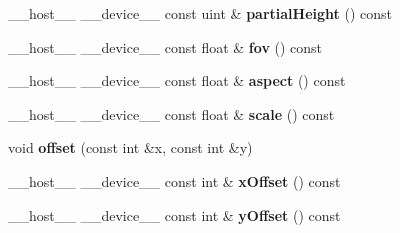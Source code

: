 \begin{DoxyCompactItemize}
\item 
\+\_\+\+\_\+host\+\_\+\+\_\+ \+\_\+\+\_\+device\+\_\+\+\_\+ const uint \& {\bfseries partial\+Height} () const\hypertarget{struct_camera_ab2c6118ca30fc99ec534d191c074279c}{}\label{struct_camera_ab2c6118ca30fc99ec534d191c074279c}

\item 
\+\_\+\+\_\+host\+\_\+\+\_\+ \+\_\+\+\_\+device\+\_\+\+\_\+ const float \& {\bfseries fov} () const\hypertarget{struct_camera_a3b18014eda80437e57d5293a846bca40}{}\label{struct_camera_a3b18014eda80437e57d5293a846bca40}

\item 
\+\_\+\+\_\+host\+\_\+\+\_\+ \+\_\+\+\_\+device\+\_\+\+\_\+ const float \& {\bfseries aspect} () const\hypertarget{struct_camera_ab6076c70d19aa5839112a033511e2640}{}\label{struct_camera_ab6076c70d19aa5839112a033511e2640}

\item 
\+\_\+\+\_\+host\+\_\+\+\_\+ \+\_\+\+\_\+device\+\_\+\+\_\+ const float \& {\bfseries scale} () const\hypertarget{struct_camera_a73cfa71841467a185998ea264839b111}{}\label{struct_camera_a73cfa71841467a185998ea264839b111}

\item 
void {\bfseries offset} (const int \&x, const int \&y)\hypertarget{struct_camera_ac0bcd3aa77ece7888c5bc1c894ae062a}{}\label{struct_camera_ac0bcd3aa77ece7888c5bc1c894ae062a}

\item 
\+\_\+\+\_\+host\+\_\+\+\_\+ \+\_\+\+\_\+device\+\_\+\+\_\+ const int \& {\bfseries x\+Offset} () const\hypertarget{struct_camera_a34b7f842855e92f9458b1e09a2952b9d}{}\label{struct_camera_a34b7f842855e92f9458b1e09a2952b9d}

\item 
\+\_\+\+\_\+host\+\_\+\+\_\+ \+\_\+\+\_\+device\+\_\+\+\_\+ const int \& {\bfseries y\+Offset} () const\hypertarget{struct_camera_a232d7fb3ef648735930cebebaa1510fe}{}\label{struct_camera_a232d7fb3ef648735930cebebaa1510fe}

\end{DoxyCompactItemize}
